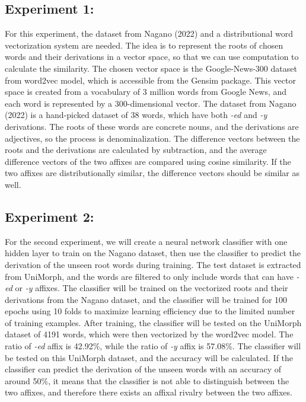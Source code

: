 \documentclass[12pt]{article}
\begin{document}
\subsection{Experiment 1:}
    For this experiment, the dataset from Nagano (2022) and a distributional word vectorization system are needed. The idea is to represent the roots of chosen words and their derivations in a vector space, so that we can use computation to calculate the similarity. The chosen vector space is the Google-News-300 dataset from word2vec model, which is accessible from the Gensim package. This vector space is created from a vocabulary of 3 million words from Google News, and each word is represented by a 300-dimensional vector. The dataset from Nagano (2022) is a hand-picked dataset of 38 words, which have both \emph{-ed} and \emph{-y} derivations. The roots of these words are concrete nouns, and the derivations are adjectives, so the process is denominalization. The difference vectors between the roots and the derivations are calculated by subtraction, and the average difference vectors of the two affixes are compared using cosine similarity. If the two affixes are distributionally similar, the difference vectors should be similar as well.

\subsection{Experiment 2:}
    For the second experiment, we will create a neural network classifier with one hidden layer to train on the Nagano dataset, then use the classifier to predict the derivation of the unseen root words during training. The test dataset is extracted from UniMorph, and the words are filtered to only include words that can have \emph{-ed} or \emph{-y} affixes. The classifier will be trained on the vectorized roots and their derivations from the Nagano dataset, and the classifier will be trained for 100 epochs using 10 folds to maximize learning efficiency due to the limited number of training examples. After training, the classifier will be tested on the UniMorph dataset of 4191 words, which were then vectorized by the word2vec model. The ratio of \emph{-ed} affix is 42.92\%, while the ratio of \emph{-y} affix is 57.08\%. The classifier will be tested on this UniMorph dataset, and the accuracy will be calculated. If the classifier can predict the derivation of the unseen words with an accuracy of around 50\%, it means that the classifier is not able to distinguish between the two affixes, and therefore there exists an affixal rivalry between the two affixes.
\end{document}
